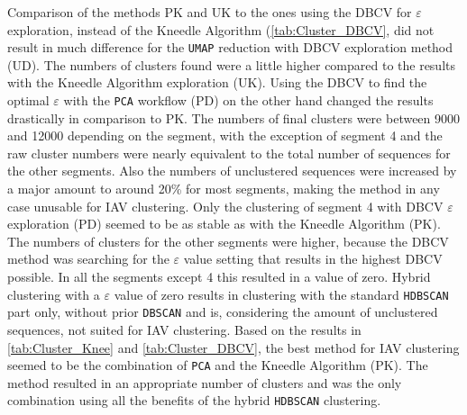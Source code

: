 \vspace{1em}

Comparison of the methods PK and UK to the ones using the \gls{DBCV} for $\varepsilon$ exploration, instead of the Kneedle Algorithm (\autoref{tab:Cluster_DBCV}, did not result in much difference for the \texttt{UMAP} reduction with \gls{DBCV} exploration method (UD). The numbers of clusters found were a little higher compared to the results with the Kneedle Algorithm exploration (UK). Using the \gls{DBCV} to find the optimal $\varepsilon$ with the \texttt{PCA} workflow (PD) on the other hand changed the results drastically in comparison to PK. The numbers of final clusters were between 9000 and 12000 depending on the segment, with the exception of segment 4 and the raw cluster numbers were nearly equivalent to the total number of sequences for the other segments. Also the numbers of unclustered sequences were increased by a major amount to around 20\% for most segments, making the method in any case unusable for \gls{IAV} clustering. Only the clustering of segment 4 with \gls{DBCV} $\varepsilon$ exploration (PD) seemed to be as stable as with the Kneedle Algorithm (PK). The numbers of clusters for the other segments were higher, because the \gls{DBCV} method was searching for the $\varepsilon$ value setting that results in the highest \gls{DBCV} possible. In all the segments except 4 this resulted in a value of zero. Hybrid clustering with a $\varepsilon$ value of zero results in clustering with the standard \texttt{HDBSCAN} part only, without prior \texttt{DBSCAN} and is, considering the amount of unclustered sequences, not suited for \gls{IAV} clustering. Based on the results in \autoref{tab:Cluster_Knee} and \autoref{tab:Cluster_DBCV}, the best method for \gls{IAV} clustering seemed to be the combination of \texttt{PCA} and the Kneedle Algorithm (PK). The method resulted in an appropriate number of clusters and was the only combination using all the benefits of the hybrid \texttt{HDBSCAN} clustering. 

